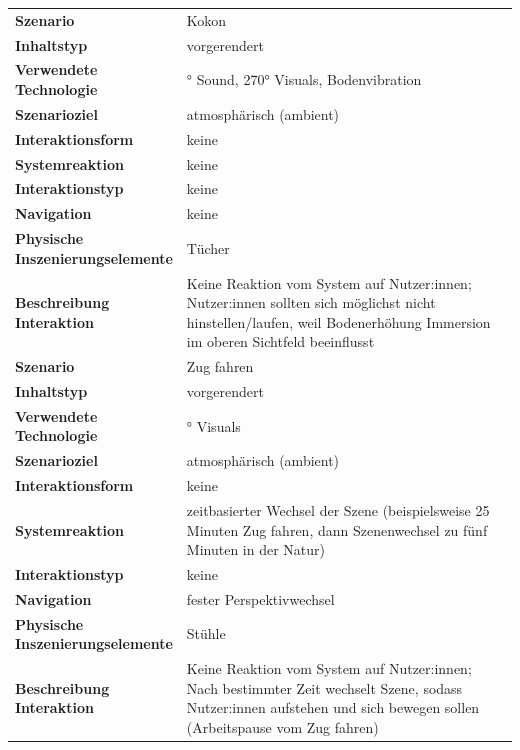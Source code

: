 \begin{longtable} {>{\raggedright\arraybackslash}p{0.3\linewidth}
    >{\raggedright\arraybackslash}p{0.7\linewidth}}
    \textbf{Szenario} & Kokon \\
    \textbf{Inhaltstyp} & vorgerendert \\
    \textbf{Verwendete Technologie} & 360° Sound, 270° Visuals, Bodenvibration \\
    \textbf{Szenarioziel} & atmosphärisch (ambient) \\
    \textbf{Interaktionsform} & keine \\
    \textbf{Systemreaktion} & keine \\
    \textbf{Interaktionstyp} & keine \\
    \textbf{Navigation} & keine \\
    \textbf{Physische Inszenierungselemente} & Tücher \\
    \textbf{Beschreibung Interaktion} & Keine Reaktion vom System auf Nutzer:innen; Nutzer:innen sollten sich möglichst nicht hinstellen/laufen, weil Bodenerhöhung Immersion im oberen Sichtfeld beeinflusst \\[0.8em]
    \midrule

    \textbf{Szenario} & Zug fahren \\
    \textbf{Inhaltstyp} & vorgerendert \\
    \textbf{Verwendete Technologie} & 270° Visuals \\
    \textbf{Szenarioziel} & atmosphärisch (ambient) \\
    \textbf{Interaktionsform} & keine \\
    \textbf{Systemreaktion} & zeitbasierter Wechsel der Szene (beispielsweise 25 Minuten Zug fahren, dann Szenenwechsel zu fünf Minuten in der Natur) \\
    \textbf{Interaktionstyp} & keine \\
    \textbf{Navigation} & fester Perspektivwechsel \\
    \textbf{Physische Inszenierungselemente} & Stühle \\
    \textbf{Beschreibung Interaktion} & Keine Reaktion vom System auf Nutzer:innen; Nach bestimmter Zeit wechselt Szene, sodass Nutzer:innen aufstehen und sich bewegen sollen (Arbeitspause vom Zug fahren) \\[0.8em]
    \midrule


\end{longtable}
